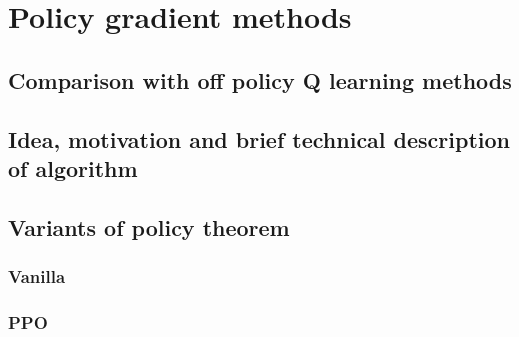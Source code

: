 \chapter{Policy gradient methods}
\section{Comparison with off policy Q learning methods}

\section{Idea, motivation and brief technical description of algorithm}

\section{Variants of policy theorem}
\subsection*{Vanilla}
\subsection*{PPO}


